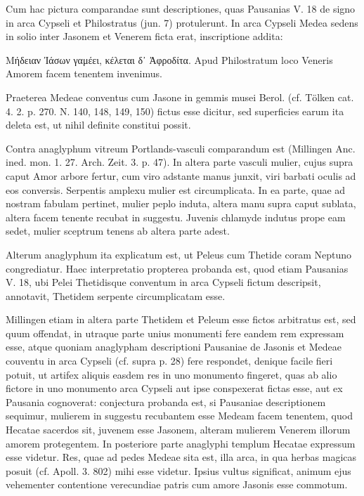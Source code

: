\documentclass[a4paper, 11pt, oneside, polutonikogreek, german]{article}
\begin{document}
Cum hac pictura comparandae sunt descriptiones, quas Pausanias V. 18 de signo in arca Cypseli et Philostratus (jun. 7) protulerunt. In arca Cypseli Medea sedens in solio inter Jasonem et Venerem ficta erat, inscriptione addita:

Μήδειαν Ἰάσων γαμέει, κέλεται δ᾽ Ἀφροδίτα. Apud Philostratum loco Veneris Amorem facem tenentem invenimus.

Praeterea Medeae conventus cum Jasone in gemmis musei Berol. (cf. Tölken cat. 4. 2. p. 270. N. 140, 148, 149, 150) fictus esse dicitur, sed superficies earum ita deleta est, ut nihil definite constitui possit.

Contra anaglyphum vitreum Portlands-vasculi comparandum est (Millingen Anc. ined. mon. 1. 27. Arch. Zeit. 3. p. 47). In altera parte vasculi mulier, cujus supra caput Amor arbore fertur, cum viro adstante manus junxit, viri barbati oculis ad eos conversis. Serpentis amplexu mulier est circumplicata. In ea parte, quae ad nostram fabulam pertinet, mulier peplo induta, altera manu supra caput sublata, altera facem tenente recubat in suggestu. Juvenis chlamyde indutus prope eam sedet, mulier sceptrum tenens ab altera parte adest.

Alterum anaglyphum ita explicatum est, ut Peleus cum Thetide coram Neptuno congrediatur. Haec interpretatio propterea probanda est, quod etiam Pausanias V. 18, ubi Pelei Thetidisque conventum in arca Cypseli fictum descripsit, annotavit, Thetidem serpente circumplicatam esse.

Millingen etiam in altera parte Thetidem et Peleum esse fictos arbitratus est, sed quum offendat, in utraque parte unius monumenti fere eandem rem expressam esse, atque quoniam anaglypham descriptioni Pausaniae de Jasonis et Medeae couventu in arca Cypseli (cf. supra p. 28) fere respondet, denique facile fieri potuit, ut artifex aliquis easdem res in uno monumento fingeret, quas ab alio fictore in uno monumento arca Cypseli aut ipse conspexerat fictas esse, aut ex Pausania cognoverat: conjectura probanda est, si Pausaniae descriptionem sequimur, mulierem in suggestu recubantem esse Medeam facem tenentem, quod Hecatae sacerdos sit, juvenem esse Jasonem, alteram mulierem Venerem illorum amorem protegentem. In posteriore parte anaglyphi templum Hecatae expressum esse videtur. Res, quae ad pedes Medeae sita est, illa arca, in qua herbas magicas posuit (cf. Apoll. 3. 802) mihi esse videtur. Ipsius vultus significat, animum ejus vehementer contentione verecundiae patris cum amore Jasonis esse commotum.
\end{document}
